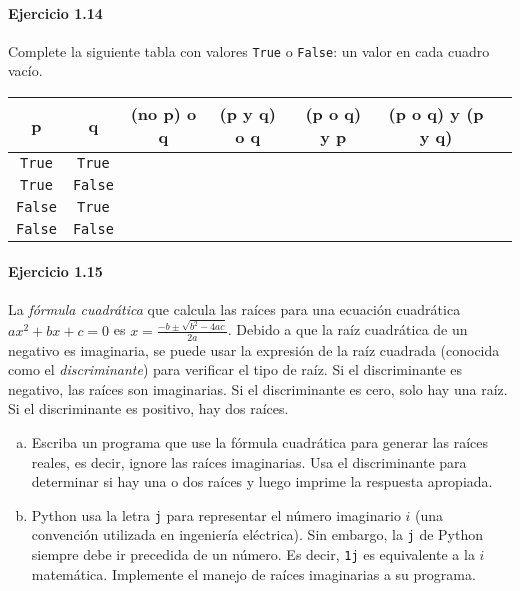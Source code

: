 \paragraph{\color{DarkBlue}Ejercicio 1.14}
Complete la siguiente tabla con valores \texttt{True} o
\texttt{False}: un valor en cada cuadro vacío.

\begin{table}[ht!]
	\centering
	\begin{tabular}{|c|c|c|c|c|c|c|}
		\hline
		p                          & q                          & (no p) o q & (p y q) o q & (p o q) y p & (p o q) y (p y q) \\
		\hline
		\texttt{True}  & \texttt{True}  &            &             &             &                   \\
		\hline
		\texttt{True}  & \texttt{False} &            &             &             &                   \\
		\hline
		\texttt{False} & \texttt{True}  &            &             &             &                   \\
		\hline
		\texttt{False} & \texttt{False} &            &             &             &                   \\
		\hline
	\end{tabular}
\end{table}

\paragraph{\color{DarkBlue}Ejercicio 1.15}
La \emph{fórmula cuadrática} que calcula las raíces para una ecuación
cuadrática $ax^{2}+bx+c=0$ es
\begin{math}
	x=
	\frac{-b\pm\sqrt{b^{2}-4ac}}{2a}
\end{math}.
Debido a que la raíz cuadrática de un negativo es imaginaria, se
puede usar la expresión de la raíz cuadrada (conocida como el
\emph{discriminante}) para verificar el tipo de raíz.
Si el discriminante es negativo, las raíces son imaginarias.
Si el discriminante es cero, solo hay una raíz.
Si el discriminante es positivo, hay dos raíces.

\begin{enumerate}[(a)]
	\item

	      Escriba un programa que use la fórmula cuadrática para
	      generar las raíces reales, es decir, ignore las raíces
	      imaginarias.
	      Usa el discriminante para determinar si hay una o dos
	      raíces y luego imprime la respuesta apropiada.

	\item

	      Python usa la letra \texttt{j} para representar
	      el número imaginario $i$ (una convención utilizada en
	      ingeniería eléctrica).
	      Sin embargo, la \texttt{j} de Python siempre debe
	      ir precedida de un número.
	      Es decir, \texttt{1j} es equivalente a la $i$
	      matemática.
	      Implemente el manejo de raíces imaginarias a su programa.
\end{enumerate}

